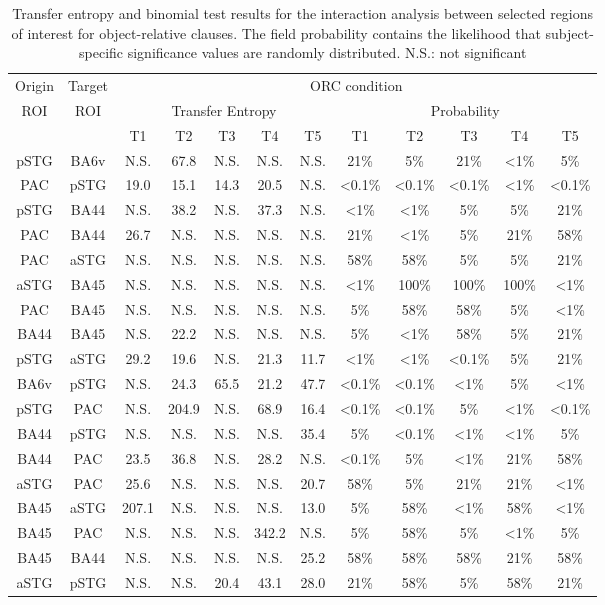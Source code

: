 \vspace{5mm}
\begin{table}[h]
\begin{center}
\begin{tabular}{cccccccccccc}
Origin & Target & \multicolumn{10}{c}{ORC condition}\\
ROI & ROI & \multicolumn{5}{c}{Transfer Entropy} & \multicolumn{5}{c}{Probability}\\
 & & T1 & T2 & T3 & T4 & \multicolumn{1}{c|}{T5} & T1 & T2 & T3 & T4 & T5\\ \hline
 pSTG & BA6v & N.S. & 67.8 & N.S. & N.S. & N.S. & 21\% & 5\% & 21\% & <1\% & 5\%\\ 
PAC & pSTG & 19.0 & 15.1 & 14.3 & 20.5 & N.S. & <0.1\% & <0.1\% & <0.1\% & <1\% & <0.1\%\\ 
pSTG & BA44 & N.S. & 38.2 & N.S. & 37.3 & N.S. & <1\% & <1\% & 5\% & 5\% & 21\%\\ 
PAC & BA44 & 26.7 & N.S. & N.S. & N.S. & N.S. & 21\% & <1\% & 5\% & 21\% & 58\%\\ 
PAC & aSTG & N.S. & N.S. & N.S. & N.S. & N.S. & 58\% & 58\% & 5\% & 5\% & 21\%\\ 
aSTG & BA45 & N.S. & N.S. & N.S. & N.S. & N.S. & <1\% & 100\% & 100\% & 100\% & <1\%\\ 
PAC & BA45 & N.S. & N.S. & N.S. & N.S. & N.S. & 5\% & 58\% & 58\% & 5\% & <1\%\\ 
BA44 & BA45 & N.S. & 22.2 & N.S. & N.S. & N.S. & 5\% & <1\% & 58\% & 5\% & 21\%\\ 
pSTG & aSTG & 29.2 & 19.6 & N.S. & 21.3 & 11.7 & <1\% & <1\% & <0.1\% & 5\% & 21\%\\ 
BA6v & pSTG & N.S. & 24.3 & 65.5 & 21.2 & 47.7 & <0.1\% & <0.1\% & <1\% & 5\% & <1\%\\ 
pSTG & PAC & N.S. & 204.9 & N.S. & 68.9 & 16.4 & <0.1\% & <0.1\% & 5\% & <1\% & <0.1\%\\ 
BA44 & pSTG & N.S. & N.S. & N.S. & N.S. & 35.4 & 5\% & <0.1\% & <1\% & <1\% & 5\%\\ 
BA44 & PAC & 23.5 & 36.8 & N.S. & 28.2 & N.S. & <0.1\% & 5\% & <1\% & 21\% & 58\%\\ 
aSTG & PAC & 25.6 & N.S. & N.S. & N.S. & 20.7 & 58\% & 5\% & 21\% & 21\% & <1\%\\ 
BA45 & aSTG & 207.1 & N.S. & N.S. & N.S. & 13.0 & 5\% & 58\% & <1\% & 58\% & <1\%\\ 
BA45 & PAC & N.S. & N.S. & N.S. & 342.2 & N.S. & 5\% & 58\% & 5\% & <1\% & 5\%\\ 
BA45 & BA44 & N.S. & N.S. & N.S. & N.S. & 25.2 & 58\% & 58\% & 58\% & 21\% & 58\%\\ 
aSTG & pSTG & N.S. & N.S. & 20.4 & 43.1 & 28.0 & 21\% & 58\% & 5\% & 58\% & 21\%\\ 
\end{tabular}
\caption{\label{4.4.TEvalues.a} Transfer entropy and binomial test results for the interaction analysis between selected regions of interest for object-relative clauses. The field probability contains the likelihood that subject-specific significance values are randomly distributed. N.S.: not significant}
\end{center}
\end{table}
